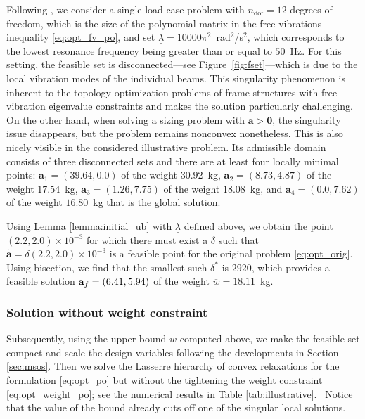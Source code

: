 \documentclass[final,onefignum,onetabnum]{siamart220329}
\begin{document}
Following \cite{Yamada2015}, we consider a single load case problem with $n_{\mathrm{dof}} = 12$ degrees of freedom, which is the size of the polynomial matrix in the free-vibrations inequality \eqref{eq:opt_fv_po}, and set $\underline{\lambda}=10000\pi^2$~rad$^2$/s$^2$, which corresponds to the lowest resonance frequency being greater than or equal to $50$~Hz. For this setting, the feasible set is disconnected---see Figure~\ref{fig:fset}---which is due to the local vibration modes of the individual beams. This singularity phenomenon is inherent to the topology optimization problems of frame structures with free-vibration eigenvalue constraints and makes the solution particularly challenging. On the other hand, when solving a sizing problem with $\mathbf{a}>\mathbf{0}$, the singularity issue disappears, but the problem remains nonconvex nonetheless. This is also nicely visible in the considered illustrative problem. 
Its admissible domain consists of three disconnected sets and there are at least four locally minimal points: $\mathbf{a}_1=(39.64, 0.0)$ of the weight $30.92$~kg, $\mathbf{a}_2=(8.73, 4.87)$ of the weight $17.54$~kg, $\mathbf{a}_3=(1.26, 7.75)$ of the weight $18.08$~kg, and $\mathbf{a}_4=(0.0, 7.62)$ of the weight $16.80$~kg that is the global solution.

Using Lemma \ref{lemma:initial_ub} with $\underline{\lambda}$ defined above, we obtain the point $(2.2, 2.0)\times 10^{-3}$ for which there must exist a $\delta$ such that $\tilde{\mathbf{a}}=\delta (2.2, 2.0)\times 10^{-3}$ is a feasible point for the original problem \eqref{eq:opt_orig}. Using bisection, we find that the smallest such $\delta^*$ is $2920$, which provides a feasible solution $\mathbf{a}_{\rm f} = (6.41, 5.94)$ of the weight $\overline{w}=18.11$~kg.

\subsubsection{Solution without weight constraint}

Subsequently, using the upper bound $\overline{w}$ computed above, we make the feasible set compact and scale the design variables following the developments in Section \ref{sec:msos}. Then we solve the Lasserre hierarchy of convex relaxations for the formulation \eqref{eq:opt_po} but without the {tightening the} weight constraint \eqref{eq:opt_weight_po}; see the numerical results in Table \ref{tab:illustrative}.\ %
Notice that the value of the bound already cuts off one of the singular local solutions.
\end{document}
